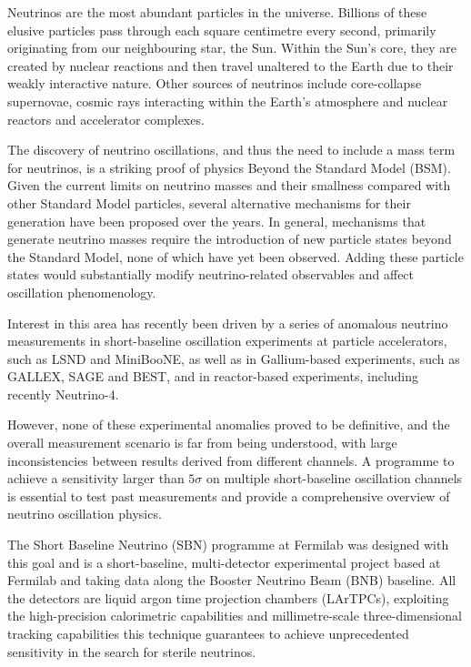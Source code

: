 

Neutrinos are the most abundant particles in the universe. Billions of these elusive particles pass through each square centimetre every second, primarily originating from our neighbouring star, the Sun. Within the Sun's core, they are created by nuclear reactions and then travel unaltered to the Earth due to their weakly interactive nature. Other sources of neutrinos include core-collapse supernovae, cosmic rays interacting within the Earth's atmosphere and nuclear reactors and accelerator complexes. 

The discovery of neutrino oscillations, and thus the need to include a mass term for neutrinos, is a striking proof of physics Beyond the Standard Model (BSM). 
Given the current limits on neutrino masses and their smallness compared with other Standard Model particles, several alternative mechanisms for their generation have been proposed over the years. In general, mechanisms that generate neutrino masses require the introduction of new particle states beyond the Standard Model, none of which have yet been observed. Adding these particle states would substantially modify neutrino-related observables and affect oscillation phenomenology. 

Interest in this area has recently been driven by a series of anomalous neutrino measurements in short-baseline oscillation experiments at particle accelerators, such as LSND and MiniBooNE, as well as in Gallium-based experiments, such as GALLEX, SAGE and BEST, and in reactor-based experiments, including recently Neutrino-4.

However, none of these experimental anomalies proved to be definitive, and the overall measurement scenario is far from being understood, with large inconsistencies between results derived from different channels. A programme to achieve a sensitivity larger than $5\sigma$ on multiple short-baseline oscillation channels is essential to test past measurements and provide a comprehensive overview of neutrino oscillation physics.

The Short Baseline Neutrino (SBN) programme at Fermilab was designed with this goal and is a short-baseline, multi-detector experimental project based at Fermilab and taking data along the Booster Neutrino Beam (BNB) baseline. All the detectors are liquid argon time projection chambers (LArTPCs), exploiting the high-precision calorimetric capabilities and millimetre-scale three-dimensional tracking capabilities this technique guarantees to achieve unprecedented sensitivity in the search for sterile neutrinos. 

